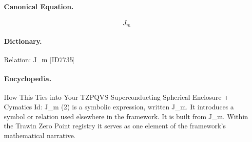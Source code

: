 \paragraph{Canonical Equation.}
\[
J_m
\]

\paragraph{Dictionary.}
Relation: J\_m [ID7735]

\paragraph{Encyclopedia.}
How This Ties into Your TZPQVS Superconducting Spherical Enclosure + Cymatics Id: J\_m (2) is a symbolic expression, written J\_m. It introduces a symbol or relation used elsewhere in the framework. It is built from J\_m. Within the Trawin Zero Point registry it serves as one element of the framework's mathematical narrative.
